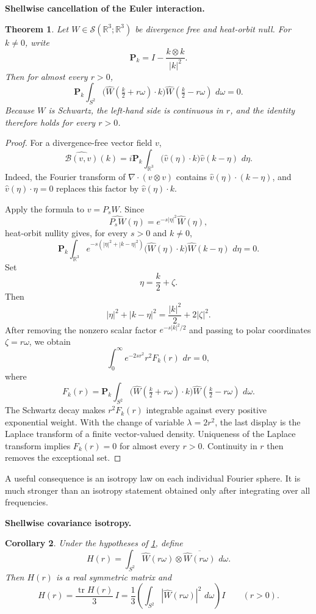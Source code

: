 \documentclass[11pt]{article}
\newtheorem{theorem}{Theorem}[section]
\newtheorem{corollary}[theorem]{Corollary}
\theoremstyle{definition}\newtheorem{problem}[theorem]{Problem}
\theoremstyle{definition}
\theoremstyle{remark}
\newcommand{\R}{\mathbb R}
\newcommand{\dd}{\,d}
\begin{document}
\medskip
\noindent\textbf{Shellwise cancellation of the Euler interaction.}
\begin{theorem}\label{thm:shellwise-cancellation}
Let \(W\in\mathcal S(\R^3;\R^3)\) be divergence free and heat-orbit null.
For \(k\ne0\), write
\[
 \mathbf P_k=I-\frac{k\otimes k}{|k|^2}.
\]
Then for almost every \(r>0\),
\[
 \boxed{
 \mathbf P_k
 \int_{S^2}
 \bigl(\widehat W(\tfrac{k}{2}+r\omega)\cdot k\bigr)
 \widehat W(\tfrac{k}{2}-r\omega)\,\dd\omega
 =0.
 }
\]
Because \(W\) is Schwartz, the left-hand side is continuous in \(r\), and the
identity therefore holds for every \(r>0\).
\end{theorem}

\begin{proof}
For a divergence-free vector field \(v\),
\[
 \widehat{\mathcal B(v,v)}(k)
 =
 i\mathbf P_k
 \int_{\R^3}
 \bigl(\widehat v(\eta)\cdot k\bigr)
 \widehat v(k-\eta)\,\dd\eta.
\]
Indeed, the Fourier transform of \(\nabla\!\cdot(v\otimes v)\) contains
\(\widehat v(\eta)\cdot(k-\eta)\), and
\(\widehat v(\eta)\cdot\eta=0\) replaces this factor by
\(\widehat v(\eta)\cdot k\).

Apply the formula to \(v=P_sW\).  Since
\[
 \widehat{P_sW}(\eta)=e^{-s|\eta|^2}\widehat W(\eta),
\]
heat-orbit nullity gives, for every \(s>0\) and \(k\ne0\),
\[
 \mathbf P_k
 \int_{\R^3}
 e^{-s(|\eta|^2+|k-\eta|^2)}
 \bigl(\widehat W(\eta)\cdot k\bigr)
 \widehat W(k-\eta)\,\dd\eta=0.
\]
Set
\[
 \eta=\frac{k}{2}+\zeta.
\]
Then
\[
 |\eta|^2+|k-\eta|^2
 =\frac{|k|^2}{2}+2|\zeta|^2.
\]
After removing the nonzero scalar factor \(e^{-s|k|^2/2}\) and passing to
polar coordinates \(\zeta=r\omega\), we obtain
\[
 \int_0^\infty e^{-2sr^2}r^2 F_k(r)\,\dd r=0,
\]
where
\[
 F_k(r)=
 \mathbf P_k
 \int_{S^2}
 \bigl(\widehat W(\tfrac{k}{2}+r\omega)\cdot k\bigr)
 \widehat W(\tfrac{k}{2}-r\omega)\,\dd\omega.
\]
The Schwartz decay makes \(r^2F_k(r)\) integrable against every positive
exponential weight.  With the change of variable \(\lambda=2r^2\), the last
display is the Laplace transform of a finite vector-valued density.  Uniqueness
of the Laplace transform implies \(F_k(r)=0\) for almost every \(r>0\).
Continuity in \(r\) then removes the exceptional set.
\end{proof}

A useful consequence is an isotropy law on each individual Fourier sphere.
It is much stronger than an isotropy statement obtained only after integrating
over all frequencies.

\medskip
\noindent\textbf{Shellwise covariance isotropy.}
\begin{corollary}\label{cor:shellwise-isotropy}
Under the hypotheses of \cref{thm:shellwise-cancellation}, define
\[
 H(r)
 =
 \int_{S^2}
 \widehat W(r\omega)\otimes
 \overline{\widehat W(r\omega)}\,\dd\omega.
\]
Then \(H(r)\) is a real symmetric matrix and
\[
 \boxed{
 H(r)=\frac{\operatorname{tr}H(r)}{3}\,I
 =
 \frac13
 \left(\int_{S^2}|\widehat W(r\omega)|^2\,\dd\omega\right)I
 }
 \qquad(r>0).
\]
\end{corollary}
\end{document}
